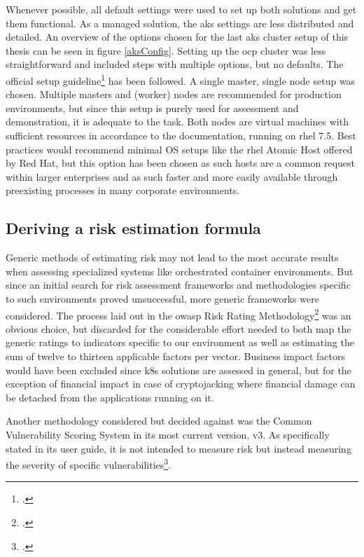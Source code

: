 Whenever possible, all default settings were used to set up both solutions and get them functional. 
As a managed solution, the \gls{aks} settings are less distributed and detailed. An overview of the options chosen for the last \gls{aks} cluster setup of this thesis can be seen in figure \ref{aksConfig}.
Setting up the \gls{ocp} cluster was less straightforward and included steps with multiple options, but no defaults. The official setup guideline\footcite[][, sections 'Planning your installation' to 'Installing OpenShift']{ocpSetup} has been followed. A single master, single node setup was chosen. Multiple masters and (worker) nodes are recommended for production environments, but since this setup is purely used for assessment and demonstration, it is adequate to the task. Both nodes are virtual machines with sufficient resources in accordance to the documentation, running on \gls{rhel} 7.5. Best practices would recommend minimal OS setups like the \gls{rhel} Atomic Host offered by Red Hat, but this option has been chosen as such hosts are a common request within larger enterprises and as such faster and more easily available through preexisting processes in many corporate environments.

\newpage
\subsection{Deriving a risk estimation formula}
Generic methods of estimating risk may not lead to the most accurate results when assessing specialized systems like orchestrated container environments.
But since an initial search for risk assessment frameworks and methodologies specific to such environments proved unsuccessful, more generic frameworks were considered. 
The process laid out in the \gls{owasp} Risk Rating Methodology\footcite[][, sections 'Step 2' to 'Step 4' ]{riskRating} was an obvious choice, but discarded for the considerable effort needed to both map the generic ratings to indicators specific to our environment as well as estimating the sum of twelve to thirteen applicable factors per vector. Business impact factors would have been excluded since \gls{k8s} solutions are assessed in general, but for the exception of financial impact in case of cryptojacking where financial damage can be detached from the applications running on it.

Another methodology considered but decided against was the Common Vulnerability Scoring System in its most current version, v3. As specifically stated in its user guide, it is not intended to measure risk but instead measuring the severity of specific vulnerabilities\footcite[][, section '2.1. CVSS Measures Severity, not Risk']{cvssUserGuide}.

